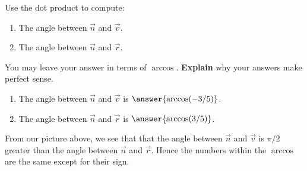 \documentclass{ximera}
\begin{document}
  

  
  \begin{problem}
    Use the dot product to compute: 
    \begin{enumerate}
    \item The angle between $\vec{n}$ and $\vec{v}$.
    \item The angle between $\vec{n}$ and $\vec{r}$.
    \end{enumerate}
    You may leave your answer in terms of $\arccos$. \textbf{Explain}
    why your answers make perfect sense.
    \begin{prompt}
      \begin{enumerate}
      \item The angle between $\vec{n}$ and $\vec{v}$ is $\answer{\arccos(-3/5)}$.
      \item The angle between $\vec{n}$ and $\vec{r}$ is $\answer{\arccos(3/5)}$.
      \end{enumerate}
      \begin{problem}
        From our picture above, we see that that the angle between
        $\vec{n}$ and $\vec{v}$ is $\pi/2$ greater than the angle
        between $\vec{n}$ and $\vec{r}$. Hence the numbers within the
        $\arccos$ are the same except for their sign.
      \end{problem}
    \end{prompt}
  \end{problem}
  
\end{document}
